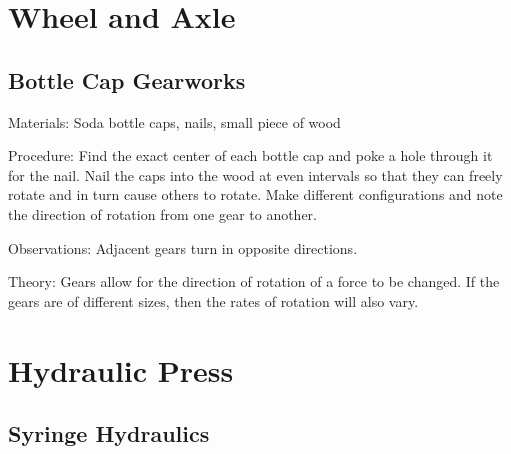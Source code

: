 \begin{multicols}{2}
\section*{Wheel and Axle} 


\subsection{Bottle Cap Gearworks}


\begin{description*}
\item[Materials:]{Soda bottle caps, nails, small piece of wood}
\item[Procedure:]{Find the exact center of each bottle cap and poke a hole through it for the nail. Nail the caps into the wood at even intervals so that they can freely rotate and in turn cause others to rotate. Make different configurations and note the direction of rotation from one gear to another.}
\item[Observations:]{Adjacent gears turn in opposite directions.}
\item[Theory:]{Gears allow for the direction of rotation of a force to be changed. If the gears are of different sizes, then the rates of rotation will also vary.}
\end{description*}

\vfill
\columnbreak


\section*{Hydraulic Press} 


\subsection{Syringe Hydraulics}


\end{multicols}
